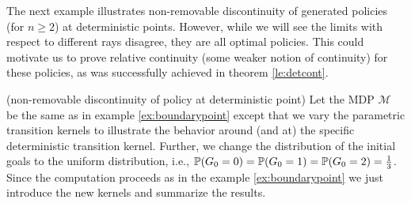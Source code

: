 The next example illustrates non-removable discontinuity of
\eUDRL{} generated policies (for $n \geq 2$)
at deterministic points. However,
while we will see the limits with respect to different rays
disagree, they are all optimal policies. This could motivate us
to prove relative continuity (some weaker notion of continuity)
for these policies, as was successfully achieved in theorem \ref{le:detcont}.
\begin{example}
\label{ex:detpoint}
(non-removable discontinuity of policy at deterministic point)
Let the MDP $\mathcal{M}$ be the same as in example \ref{ex:boundarypoint} except that we vary the parametric
transition kernels to illustrate the behavior around (and at) the specific deterministic transition kernel. Further, we change the distribution of the initial goals to the uniform distribution, i.e., $\mathbb{P}(G_0 = 0) = \mathbb{P}(G_0 = 1) = \mathbb{P}(G_0 = 2) = \frac{1}{3}$.
Since the computation proceeds as in the example \ref{ex:boundarypoint} we just introduce the new kernels and summarize
the results.


\end{example}
